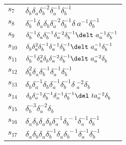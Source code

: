 \documentclass{article}
\begin{document}
\begin{center}
\begin{tabular}{ll}
$s_{7}$ & $\delta_b^{}\delta_a^{}\delta_b^{-2}\delta_a^{-1}\delta_b^{-1}$ \\
$s_{8}$ & $\delta_b^{-1}\delta_a^{}\delta_b^{}\delta_a^{-2}\delta_b^{-1}\delta_\
a^{-1}\delta_b^{-1}$ \\
$s_{9}$ & $\delta_b^{-1}\delta_a^{}\delta_b^{-1}\delta_a^{-2}\delta_b^{-1}\delt\
a_a^{-1}\delta_b^{-1}$ \\
$s_{10}$ & $\delta_b^{}\delta_a^{2}\delta_b^{-1}\delta_a^{-1}\delta_b^{-1}\delt\
a_a^{-1}\delta_b^{-1}$ \\
$s_{11}$ & $\delta_b^{-1}\delta_a^{2}\delta_b^{}\delta_a^{-2}\delta_b^{-1}\delt\
a_a^{-2}\delta_b^{}$ \\
$s_{12}$ & $\delta_b^{2}\delta_a^{}\delta_b^{-1}\delta_a^{-1}\delta_b^{-1}$ \\
$s_{13}$ & $\delta_b^{}\delta_a^{-1}\delta_b^{}\delta_a^{-1}\delta_b^{-1}\delta\
_a^{-2}\delta_b^{}$ \\
$s_{14}$ & $\delta_b^{}\delta_a^{-1}\delta_b^{-1}\delta_a^{-1}\delta_b^{-1}\del\
ta_a^{-2}\delta_b^{}$ \\
$s_{15}$ & $\delta_b^{-3}\delta_a^{-2}\delta_b^{}$ \\
$s_{16}$ & $\delta_a^{}\delta_b^{}\delta_a^{}\delta_b^{}\delta_a^{-1}\delta_b^{\
-1}\delta_a^{-1}\delta_b^{-1}$ \\
$s_{17}$ & $\delta_a^{}\delta_b^{}\delta_a^{}\delta_b^{-1}\delta_a^{}\delta_b^{\
-1}\delta_a^{-1}\delta_b^{-1}$ \\
\bottomrule
\end{tabular}
\end{center}

\thispagestyle{empty}
\end{document}
